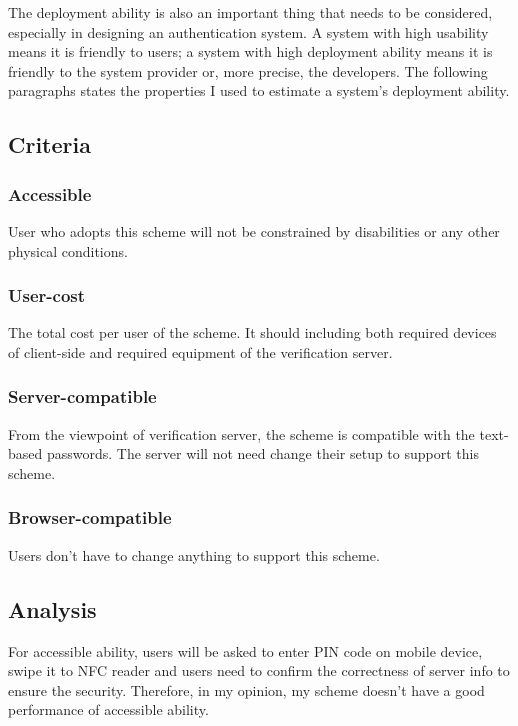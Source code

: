 \begin{CJK}{Bg5}{bsmi}
The deployment ability is also an important thing that needs to be considered, especially in designing an authentication system. A system with high usability means it is friendly to users; a system with high deployment ability means it is friendly to the system provider or, more precise, the developers. The following paragraphs states the properties I used to estimate a system's deployment ability.

\subsection{Criteria}

\subsubsection{Accessible}

User who adopts this scheme will not be constrained by disabilities or any other physical conditions.

\subsubsection{User-cost}

The total cost per user of the scheme. It should including both required devices of client-side and required equipment of the verification server.

\subsubsection{Server-compatible}

From the viewpoint of verification server, the scheme is compatible with the text-based passwords. The server will not need change their setup to support this scheme. 

\subsubsection{Browser-compatible}

Users don't have to change anything to support this scheme. 

\subsection{Analysis}

For accessible ability, users will be asked to enter PIN code on mobile device, swipe it to NFC reader and users need to confirm the correctness of server info to ensure the security. Therefore, in my opinion, my scheme doesn't have a good performance of accessible ability.


\end{CJK}
